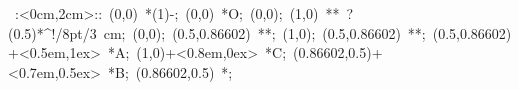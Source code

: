 %


\hbox{
\xy    <2cm,0cm>:<0cm,2cm>::
       (0,0) *\ellipse(1){-}; (0,0) *{O}; (0,0);
       (1,0) **\dir{-} ?(0.5)*^!/8pt/\hbox{3 cm};
       (0,0); (0.5,0.86602) **\dir{-};
       (1,0); (0.5,0.86602) **\dir{-};
       (0.5,0.86602)+<0.5em,1ex> *{A};
       (1,0)+<0.8em,0ex> *{C};
       (0.86602,0.5)+<0.7em,0.5ex> *{B};  
       (0.86602,0.5) *{\bullet};  
\endxy}

